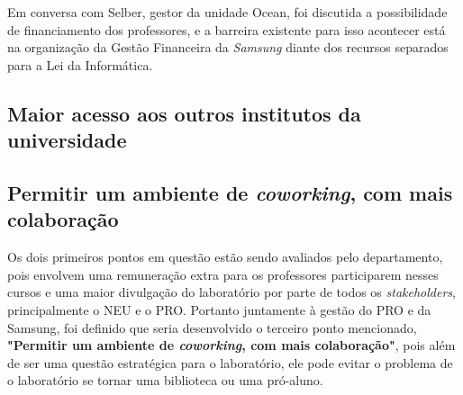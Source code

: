 Em conversa com Selber, gestor da unidade Ocean, foi discutida a possibilidade de financiamento dos professores, e a barreira existente para isso acontecer está na organização da Gestão Financeira da \textit{Samsung} diante dos recursos separados para a Lei da Informática.


\subsection{Maior acesso aos outros institutos da universidade}
\subsection{Permitir um ambiente de \textit{coworking}, com mais colaboração}

Os dois primeiros pontos em questão estão sendo avaliados pelo departamento, pois envolvem uma remuneração extra para os professores participarem nesses cursos e uma maior divulgação do laboratório por parte de todos os \textit{stakeholders}, principalmente o NEU e o PRO. Portanto juntamente à gestão do PRO e da Samsung, foi definido que seria desenvolvido o terceiro ponto mencionado, \textbf{"Permitir um ambiente de \textit{coworking}, com mais colaboração"}, pois além de ser uma questão estratégica para o laboratório, ele pode evitar o problema de o laboratório se tornar uma biblioteca ou uma pró-aluno.

